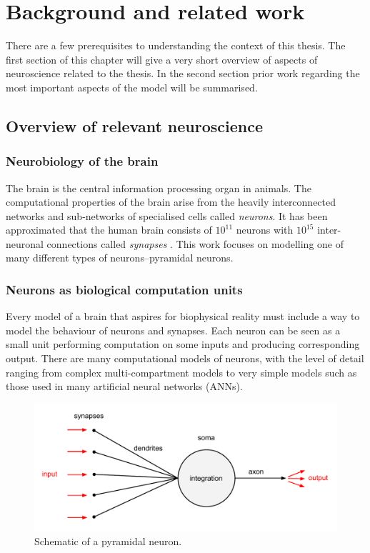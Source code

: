 \documentclass[a4paper,12pt]{report}
\theoremstyle{definition}
\begin{document}

\chapter{Background and related work}

There are a few prerequisites to understanding the context of this thesis. The first section of this chapter will give a very short overview of aspects of neuroscience related to the thesis. In the second section prior work regarding the most important aspects of the model will be summarised.


\section{Overview of relevant neuroscience}

\subsection{Neurobiology of the brain} %
The brain is the central information processing organ in animals. The computational properties of the brain arise from the heavily interconnected networks and sub-networks of specialised cells called \emph{neurons}. It has been approximated that the human brain consists of $10^{11}$ neurons with $10^{15}$ inter-neuronal connections called \emph{synapses} \cite{herculano2009human}. This work focuses on modelling one of many different types of neurons--pyramidal neurons.


\subsection{Neurons as biological computation units}
Every model of a brain that aspires for biophysical reality must include a way to model the behaviour of neurons and synapses. Each neuron can be seen as a small unit performing computation on some inputs and producing corresponding output. There are many computational models of neurons, with the level of detail ranging from complex multi-compartment models to very simple models such as those used in many artificial neural networks (ANNs). 

\begin{figure}[h]
    \includegraphics[width=\textwidth]{figures/fig1.pdf}
    \caption{Schematic of a pyramidal neuron.}
    \label{fig:pyramidal}
\end{figure}
\end{document}
